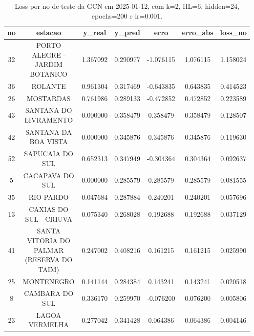 \begin{table}[h]
\centering
\caption{Loss por no de teste da GCN em 2025-01-12, com k=2, HL=6, hidden=24, epochs=200 e lr=0.001.}
\label{tab:gcn_loss_k2_hl6_h24_e200_d20250112}
\begin{tabular}{ccccccc}
\toprule
no & estacao & y\_real & y\_pred & erro & erro\_abs & loss\_no \\
\midrule
32 & PORTO ALEGRE - JARDIM BOTANICO & 1.367092 & 0.290977 & -1.076115 & 1.076115 & 1.158024 \\
36 & ROLANTE & 0.961304 & 0.317469 & -0.643835 & 0.643835 & 0.414523 \\
26 & MOSTARDAS & 0.761986 & 0.289133 & -0.472852 & 0.472852 & 0.223589 \\
43 & SANTANA DO LIVRAMENTO & 0.000000 & 0.358479 & 0.358479 & 0.358479 & 0.128507 \\
42 & SANTANA DA BOA VISTA & 0.000000 & 0.345876 & 0.345876 & 0.345876 & 0.119630 \\
52 & SAPUCAIA DO SUL & 0.652313 & 0.347949 & -0.304364 & 0.304364 & 0.092637 \\
5 & CACAPAVA DO SUL & 0.000000 & 0.285579 & 0.285579 & 0.285579 & 0.081555 \\
35 & RIO PARDO & 0.047684 & 0.287884 & 0.240201 & 0.240201 & 0.057696 \\
13 & CAXIAS DO SUL - CRIUVA & 0.075340 & 0.268028 & 0.192688 & 0.192688 & 0.037129 \\
41 & SANTA VITORIA DO PALMAR (RESERVA DO TAIM) & 0.247002 & 0.408216 & 0.161215 & 0.161215 & 0.025990 \\
25 & MONTENEGRO & 0.141144 & 0.284384 & 0.143241 & 0.143241 & 0.020518 \\
8 & CAMBARA DO SUL & 0.336170 & 0.259970 & -0.076200 & 0.076200 & 0.005806 \\
23 & LAGOA VERMELHA & 0.277042 & 0.341428 & 0.064386 & 0.064386 & 0.004146 \\
\bottomrule
\end{tabular}
\end{table}

